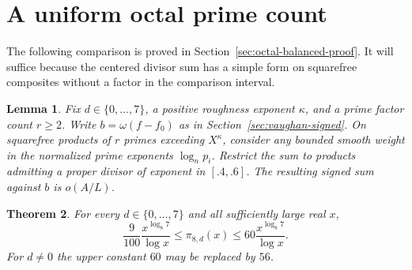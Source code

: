 \documentclass[11pt,a4paper]{article}
\theoremstyle{paperplain}
\newtheorem{theorem}{Theorem}[section]
\newtheorem{lemma}[theorem]{Lemma}
\numberwithin{equation}{section}
\begin{document}
\section{A uniform octal prime count}
\label{sec:octal-prime-count}

The following comparison is proved in Section~\ref{sec:octal-balanced-proof}.
It will suffice because the centered divisor sum has a simple form on
squarefree composites without a factor in the comparison interval.

\begin{lemma}\label{octal:balanced-shape-comparison}
Fix $d\in\{0,\ldots,7\}$, a positive roughness exponent $\kappa$,
and a prime factor count $r\ge2$. Write $b=\omega(f-f_0)$ as in
Section~\ref{sec:vaughan-signed}. On squarefree products of $r$
primes exceeding $X^\kappa$, consider any bounded smooth weight in
the normalized prime exponents $\log_n p_i$. Restrict the sum to
products admitting a proper divisor of exponent in $[.4,.6]$.
The resulting signed sum against $b$ is $o(A/L)$.
\end{lemma}

\begin{theorem}\label{octal:prime-count}
For every $d\in\{0,\ldots,7\}$ and all sufficiently large real $x$,
\[
 \frac9{100}\frac{x^{\log_8 7}}{\log x}
   \le \pi_{8,d}(x)
   \le 60\frac{x^{\log_8 7}}{\log x}.
\]
For $d\ne0$ the upper constant $60$ may be replaced by $56$.
\end{theorem}
\end{document}

